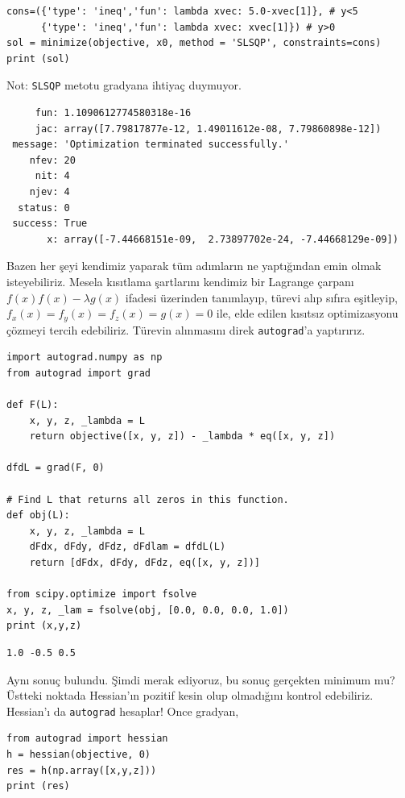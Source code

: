 \documentclass[12pt,fleqn]{article}\usepackage{../../common}
\begin{document}
\begin{verbatim}
cons=({'type': 'ineq','fun': lambda xvec: 5.0-xvec[1]}, # y<5
      {'type': 'ineq','fun': lambda xvec: xvec[1]}) # y>0
sol = minimize(objective, x0, method = 'SLSQP', constraints=cons)
print (sol)
\end{verbatim}

Not: \verb!SLSQP! metotu gradyana ihtiyaç duymuyor. 

\begin{verbatim}
     fun: 1.1090612774580318e-16
     jac: array([7.79817877e-12, 1.49011612e-08, 7.79860898e-12])
 message: 'Optimization terminated successfully.'
    nfev: 20
     nit: 4
    njev: 4
  status: 0
 success: True
       x: array([-7.44668151e-09,  2.73897702e-24, -7.44668129e-09])
\end{verbatim}

Bazen her şeyi kendimiz yaparak tüm adımların ne yaptığından emin olmak
isteyebiliriz. Mesela kısıtlama şartlarını kendimiz bir Lagrange çarpanı
$f(x) f(x) - \lambda g(x)$ ifadesi üzerinden tanımlayıp, türevi alıp sıfıra
eşitleyip, $f_x(x)=f_y(x)=f_z(x)=g(x)=0$ ile, elde edilen kısıtsız
optimizasyonu çözmeyi tercih edebiliriz. Türevin alınmasını direk
\verb!autograd!'a yaptırırız.

\begin{verbatim}
import autograd.numpy as np
from autograd import grad

def F(L):
    x, y, z, _lambda = L
    return objective([x, y, z]) - _lambda * eq([x, y, z])

dfdL = grad(F, 0)

# Find L that returns all zeros in this function.
def obj(L):
    x, y, z, _lambda = L
    dFdx, dFdy, dFdz, dFdlam = dfdL(L)
    return [dFdx, dFdy, dFdz, eq([x, y, z])]

from scipy.optimize import fsolve
x, y, z, _lam = fsolve(obj, [0.0, 0.0, 0.0, 1.0])
print (x,y,z)
\end{verbatim}

\begin{verbatim}
1.0 -0.5 0.5
\end{verbatim}

Aynı sonuç bulundu. Şimdi merak ediyoruz, bu sonuç gerçekten minimum mu?
Üstteki noktada Hessian'ın pozitif kesin olup olmadığını kontrol
edebiliriz. Hessian'ı da \verb!autograd! hesaplar! Once gradyan,

\begin{verbatim}
from autograd import hessian
h = hessian(objective, 0)
res = h(np.array([x,y,z]))
print (res)
\end{verbatim}
\end{document}
